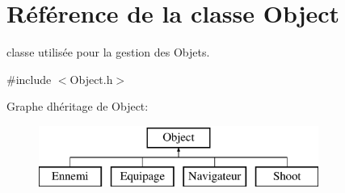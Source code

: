 \hypertarget{class_object}{}\section{Référence de la classe Object}
\label{class_object}


classe utilisée pour la gestion des Objets.  




{\ttfamily \#include $<$Object.\+h$>$}

Graphe d\textquotesingle{}héritage de Object\+:\begin{figure}[H]
\begin{center}
\leavevmode
\includegraphics[height=2.000000cm]{class_object}
\end{center}
\end{figure}
